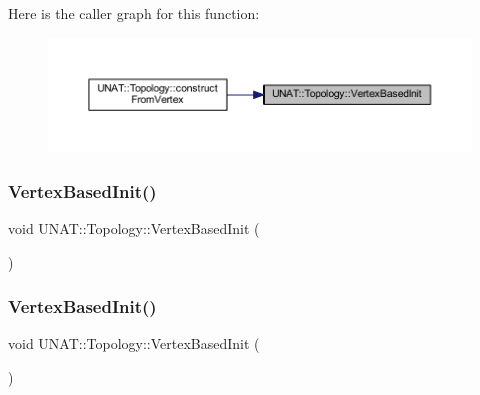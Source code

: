 Here is the caller graph for this function\+:
\nopagebreak
\begin{figure}[H]
\begin{center}
\leavevmode
\includegraphics[width=350pt]{classUNAT_1_1Topology_ad9846b484f49c6b4c55c5f9dbe6c6e77_icgraph}
\end{center}
\end{figure}
\mbox{\label{classUNAT_1_1Topology_ad9846b484f49c6b4c55c5f9dbe6c6e77}} 
\subsubsection{\texorpdfstring{VertexBasedInit()}{VertexBasedInit()}\hspace{0.1cm}{\footnotesize\ttfamily [2/3]}}
{\footnotesize\ttfamily void U\+N\+A\+T\+::\+Topology\+::\+Vertex\+Based\+Init (\begin{DoxyParamCaption}{ }\end{DoxyParamCaption})\hspace{0.3cm}{\ttfamily [private]}}

\mbox{\label{classUNAT_1_1Topology_ad9846b484f49c6b4c55c5f9dbe6c6e77}} 
\subsubsection{\texorpdfstring{VertexBasedInit()}{VertexBasedInit()}\hspace{0.1cm}{\footnotesize\ttfamily [3/3]}}
{\footnotesize\ttfamily void U\+N\+A\+T\+::\+Topology\+::\+Vertex\+Based\+Init (\begin{DoxyParamCaption}{ }\end{DoxyParamCaption})\hspace{0.3cm}{\ttfamily [private]}}

